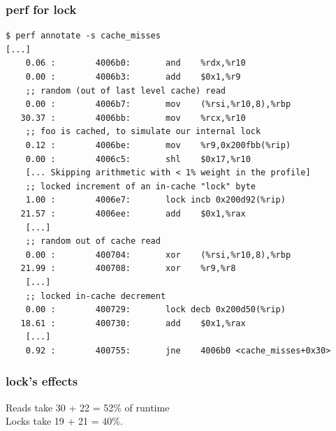 \begin{frame}[fragile]
  \frametitle{perf for lock}

    \begin{lstlisting}
$ perf annotate -s cache_misses
[...]
    0.06 :        4006b0:       and    %rdx,%r10
    0.00 :        4006b3:       add    $0x1,%r9
    ;; random (out of last level cache) read
    0.00 :        4006b7:       mov    (%rsi,%r10,8),%rbp
   30.37 :        4006bb:       mov    %rcx,%r10
    ;; foo is cached, to simulate our internal lock
    0.12 :        4006be:       mov    %r9,0x200fbb(%rip)
    0.00 :        4006c5:       shl    $0x17,%r10
    [... Skipping arithmetic with < 1% weight in the profile]
    ;; locked increment of an in-cache "lock" byte
    1.00 :        4006e7:       lock incb 0x200d92(%rip)
   21.57 :        4006ee:       add    $0x1,%rax
    [...]
    ;; random out of cache read
    0.00 :        400704:       xor    (%rsi,%r10,8),%rbp
   21.99 :        400708:       xor    %r9,%r8
    [...]
    ;; locked in-cache decrement
    0.00 :        400729:       lock decb 0x200d50(%rip)
   18.61 :        400730:       add    $0x1,%rax
    [...]
    0.92 :        400755:       jne    4006b0 <cache_misses+0x30>
    \end{lstlisting}


\end{frame}

\begin{frame}
  \frametitle{lock's effects}

  
    Reads take 30 + 22 = 52\% of runtime\\
    Locks take 19 + 21 = 40\%.
  

\end{frame}

